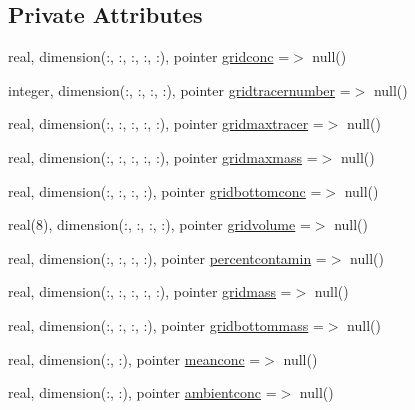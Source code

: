 \subsection*{Private Attributes}
\begin{DoxyCompactItemize}
\item 
real, dimension(\+:, \+:, \+:, \+:, \+:), pointer \mbox{\hyperlink{structmodulelagrangianglobal_1_1t__lag2euler_aa14dd8bcf88053375b270a3192efb14c}{gridconc}} =$>$ null()
\item 
integer, dimension(\+:, \+:, \+:, \+:), pointer \mbox{\hyperlink{structmodulelagrangianglobal_1_1t__lag2euler_af845cc6335a6b72c4607a12178a75a3d}{gridtracernumber}} =$>$ null()
\item 
real, dimension(\+:, \+:, \+:, \+:, \+:), pointer \mbox{\hyperlink{structmodulelagrangianglobal_1_1t__lag2euler_a62aa68b966e6e49cf0c679d874f66e37}{gridmaxtracer}} =$>$ null()
\item 
real, dimension(\+:, \+:, \+:, \+:, \+:), pointer \mbox{\hyperlink{structmodulelagrangianglobal_1_1t__lag2euler_a474c458a77022bb2112c9bab2f34e888}{gridmaxmass}} =$>$ null()
\item 
real, dimension(\+:, \+:, \+:, \+:), pointer \mbox{\hyperlink{structmodulelagrangianglobal_1_1t__lag2euler_afbbedc487d75f64a2bf2debf1709c046}{gridbottomconc}} =$>$ null()
\item 
real(8), dimension(\+:, \+:, \+:, \+:), pointer \mbox{\hyperlink{structmodulelagrangianglobal_1_1t__lag2euler_a38b1a4533e85878c4f3e864efac5f1b5}{gridvolume}} =$>$ null()
\item 
real, dimension(\+:, \+:, \+:, \+:), pointer \mbox{\hyperlink{structmodulelagrangianglobal_1_1t__lag2euler_a8a093aae11bb333937ef60125a9197aa}{percentcontamin}} =$>$ null()
\item 
real, dimension(\+:, \+:, \+:, \+:, \+:), pointer \mbox{\hyperlink{structmodulelagrangianglobal_1_1t__lag2euler_a28369a2343af1ee27ada2844bee8c09c}{gridmass}} =$>$ null()
\item 
real, dimension(\+:, \+:, \+:, \+:), pointer \mbox{\hyperlink{structmodulelagrangianglobal_1_1t__lag2euler_acf4fda8702cf13a816b453500df295f1}{gridbottommass}} =$>$ null()
\item 
real, dimension(\+:, \+:), pointer \mbox{\hyperlink{structmodulelagrangianglobal_1_1t__lag2euler_a5d472bce6e5b2be108e83510ab6350e9}{meanconc}} =$>$ null()
\item 
real, dimension(\+:, \+:), pointer \mbox{\hyperlink{structmodulelagrangianglobal_1_1t__lag2euler_a4d7d3e940caa88ae369597a87154d4fb}{ambientconc}} =$>$ null()

\end{DoxyCompactItemize}
